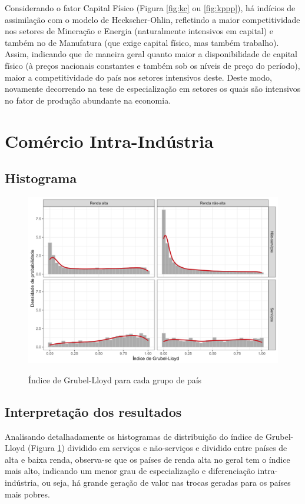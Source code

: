 Considerando o fator Capital Físico (Figura \ref{fig:kc} ou \ref{fig:kppp}), há indícios de assimilação com o modelo de Heckscher-Ohlin, refletindo a maior competitividade nos setores de Mineração e Energia (naturalmente intensivos em capital) e também no de Manufatura (que exige capital físico, mas também trabalho). Assim, indicando que de maneira geral quanto maior a disponibilidade de capital físico (à preços nacionais constantes e também sob os níveis de preço do período), maior a competitividade do país nos setores intensivos deste. Deste modo, novamente decorrendo na tese de especialização em setores os quais são intensivos no fator de produção abundante na economia.

\clearpage
\section{Comércio Intra-Indústria}
\setcounter{subsection}{5}

\subsection{Histograma}

\begin{figure}[!h]
    \centering
    \caption{Índice de Grubel-Lloyd para cada grupo de país}
    \includegraphics*[width = 0.8\linewidth]{../plots/gl.png}
    \label{fig:gl}
\end{figure}

\subsection{Interpretação dos resultados}

Analisando detalhadamente os histogramas de distribuição do índice de Grubel-Lloyd (Figura \ref{fig:gl}) dividido em serviços e não-serviços e dividido entre países de alta e baixa renda, observa-se que os países de renda alta no geral tem o índice mais alto, indicando um menor grau de especialização e diferenciação intra-indústria, ou seja, há grande geração de valor nas trocas geradas para os países mais pobres.


